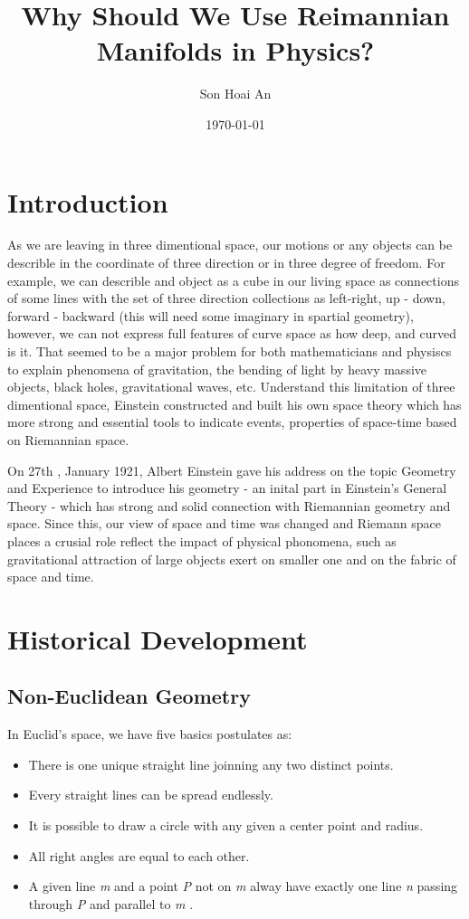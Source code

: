 \documentclass[11pt,a4paper]{article}
\title{Why Should We Use Reimannian Manifolds in Physics?}
\date{\today}
\author{Son Hoai An}
\begin{document}
	\maketitle
	
	\tableofcontents
	\pagebreak
	
	\section{Introduction}
	As  we are leaving in three dimentional space, our motions or any objects can be describle in the coordinate of three direction or in three degree of  freedom.  For example, we can describle and object as a cube in our living space as connections of some lines with the set of three direction collections as left-right, up - down, forward - backward (this will need some imaginary in spartial geometry), however, we can not express full features of curve space as how deep, and curved is it.  That seemed to be a major problem for both mathematicians and physiscs to explain phenomena of gravitation, the bending of light by heavy massive objects, black holes, gravitational waves, etc.  Understand this limitation of  three dimentional space, Einstein constructed and built his own space theory which has more strong and essential tools to indicate events, properties of space-time based on Riemannian space.
	
	On 27th , January 1921, Albert Einstein gave his address on  the topic Geometry and Experience  to introduce his geometry  -  an inital part in Einstein's General Theory - which has strong and solid connection with Riemannian geometry and space. Since this, our view of space and time was changed and Riemann space places a crusial role reflect the impact of physical phonomena, such as gravitational attraction of large objects exert on smaller one and on the fabric of space and time. 
	
	\section{Historical Development}
	\subsection{Non-Euclidean Geometry}
	In Euclid's space, we have five basics postulates as:
	\begin{itemize}
		\setlength{\itemindent}{.2in}
		\item  There is one unique straight line joinning any two distinct points.
		\item Every straight lines can be spread  endlessly.
		\item  It is possible to draw a circle with any given a center point and radius. 
		\item All right angles are equal to each other.
		\item  A given line \textit{m} and a point \textit{P}  not on  \textit{m}  alway have exactly one  line \textit{n} passing through \textit{P} and parallel to \textit{m} .
	\end{itemize}
	
\end{document}
